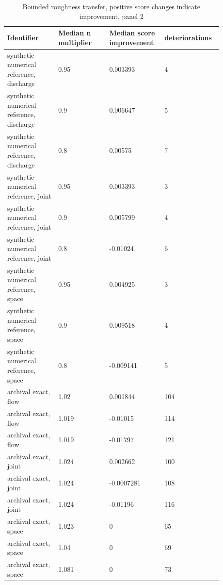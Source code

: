 \begin{longtable}{p{0.2200\linewidth}p{0.2200\linewidth}p{0.2200\linewidth}p{0.2200\linewidth}}
\caption{Bounded roughness transfer, positive score changes indicate improvement, panel 2}\\
\hline
Identifier & Median n multiplier & Median score improvement & deteriorations \\
\hline\endhead
synthetic numerical reference, discharge & 0.95 & 0.003393 & 4 \\
synthetic numerical reference, discharge & 0.9 & 0.006647 & 5 \\
synthetic numerical reference, discharge & 0.8 & 0.00575 & 7 \\
synthetic numerical reference, joint & 0.95 & 0.003393 & 3 \\
synthetic numerical reference, joint & 0.9 & 0.005799 & 4 \\
synthetic numerical reference, joint & 0.8 & -0.01024 & 6 \\
synthetic numerical reference, space & 0.95 & 0.004925 & 3 \\
synthetic numerical reference, space & 0.9 & 0.009518 & 4 \\
synthetic numerical reference, space & 0.8 & -0.009141 & 5 \\
archival exact, flow & 1.02 & 0.001844 & 104 \\
archival exact, flow & 1.019 & -0.01015 & 114 \\
archival exact, flow & 1.019 & -0.01797 & 121 \\
archival exact, joint & 1.024 & 0.002662 & 100 \\
archival exact, joint & 1.024 & -0.0007281 & 108 \\
archival exact, joint & 1.024 & -0.01196 & 116 \\
archival exact, space & 1.023 & 0 & 65 \\
archival exact, space & 1.04 & 0 & 69 \\
archival exact, space & 1.081 & 0 & 73 \\
\end{longtable}
\endgroup
